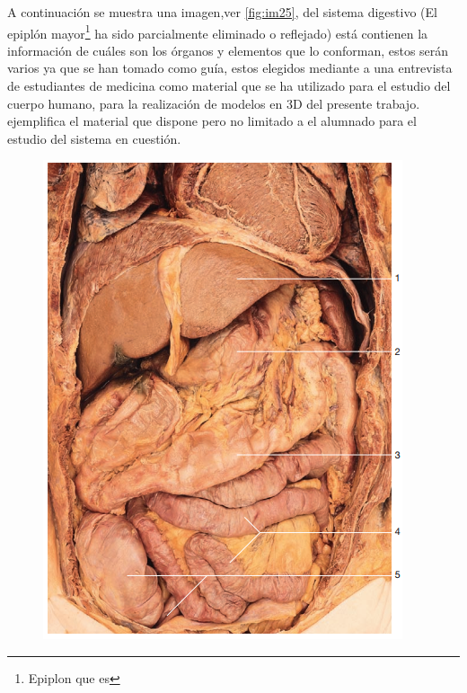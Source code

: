 A continuación se muestra una imagen,ver \ref{fig:im25}, del sistema digestivo (El epiplón mayor\footnote{Epiplon que es} ha sido parcialmente eliminado o reflejado)  está contienen la información de cuáles son los órganos y elementos que lo conforman, estos serán 
varios ya que se han tomado como guía, estos elegidos mediante a una entrevista de estudiantes de medicina como material que se ha utilizado para el estudio del cuerpo 
humano, para la realización de modelos en 3D del presente trabajo. ejemplifica el material que dispone pero no limitado a el alumnado para el estudio del sistema en cuestión.\\
\begin{figure}[H]
	\begin{center}
 		\includegraphics[width = .3\textwidth]{source/images/image72.png}
	\end{center} 
\end{figure}


